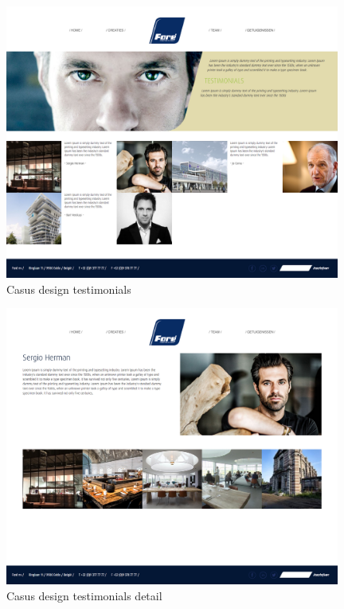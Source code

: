 \begin{figure}[!ht]
  \includegraphics[width=110mm]{img/design-03.png}
  \centering
  \caption{Casus design testimonials}
  \label{fig:Casus design testimonials}
\end{figure}

\begin{figure}[!ht]
  \includegraphics[width=110mm]{img/design-04.png}
  \centering
  \caption{Casus design testimonials detail}
  \label{fig:Casus design testimonials detail}
\end{figure}

